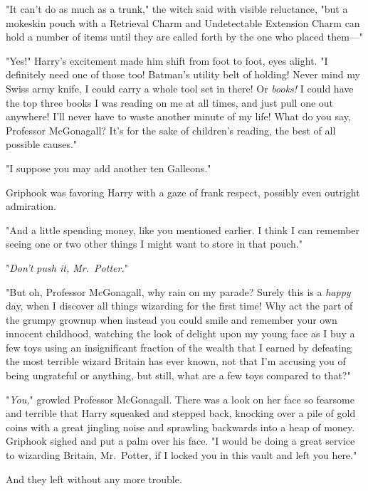 "It can't do as much as a trunk," the witch said with visible reluctance,
"but{\el} a mokeskin pouch with a Retrieval Charm and Undetectable Extension
Charm can hold a number of items until they are called forth by the one who
placed them—"

"Yes!" Harry's excitement made him shift from foot to foot,
eyes alight. "I definitely need one of those too! 
Batman's utility belt of holding! Never mind my Swiss
army knife, I could carry a whole tool set in there! Or \emph{books!} I could
have the top three books I was reading on me at all times, and just pull one
out anywhere! I'll never have to waste another minute of my life! What do you
say, Professor McGonagall? It's for the sake of children's reading, the best of
all possible causes."

"{\el}I suppose you may add another ten Galleons."

Griphook was favoring Harry with a gaze of frank respect, possibly even
outright admiration.

"And a little spending money, like you mentioned earlier. I think I can
remember seeing one or two other things I might want to store in that pouch."

"\emph{Don't push it, Mr.~Potter.}"

"But oh, Professor McGonagall, why rain on my parade? Surely this is a
\emph{happy} day, when I discover all things wizarding for the first time! Why
act the part of the grumpy grownup when instead you could smile and remember
your own innocent childhood, watching the look of delight upon my young face as
I buy a few toys using an insignificant fraction of the wealth that I earned by
defeating the most terrible wizard Britain has ever known, not that I'm
accusing you of being ungrateful or anything, but still, what are a few toys
compared to that?"

"\emph{You,}" growled Professor McGonagall. There was a look on her face so
fearsome and terrible that Harry squeaked and stepped back, knocking over a
pile of gold coins with a great jingling noise and sprawling backwards into a
heap of money. Griphook sighed and put a palm over his face. "I would be doing
a great service to wizarding Britain, Mr.~Potter, if I locked you in this vault
and left you here."

And they left without any more trouble.
